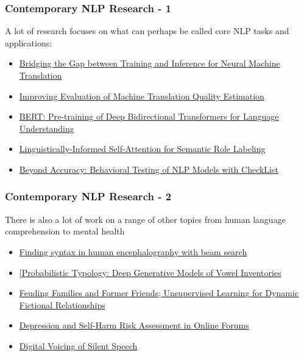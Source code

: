 \documentclass{beamer}
\begin{document}
\begin{frame}
\frametitle{Contemporary NLP Research - 1}
A lot of research focuses on what can perhaps be called core NLP tasks and applications:  
\begin{itemize}
    \item \href{https://www.aclweb.org/anthology/P19-1426/}{Bridging the Gap between Training and Inference for Neural Machine Translation}
    \item \href{https://www.aclweb.org/anthology/P15-1174/}{Improving Evaluation of Machine Translation Quality Estimation}
    \item \href{https://www.aclweb.org/anthology/N19-1423/}{BERT: Pre-training of Deep Bidirectional Transformers for Language Understanding}
    \item \href{https://www.aclweb.org/anthology/D18-1548/}{Linguistically-Informed Self-Attention for Semantic Role Labeling}
    \item \href{https://www.aclweb.org/anthology/2020.acl-main.442}{Beyond Accuracy: Behavioral Testing of NLP Models with CheckList}
\end{itemize}  
\end{frame}

\begin{frame}
\frametitle{Contemporary NLP Research - 2}
There is also a lot of work on a range of other topics from human language comprehension to mental health
\begin{itemize}
\item \href{https://www.aclweb.org/anthology/P18-1254/}{Finding syntax in human encephalography with beam search}
\item \href{https://www.aclweb.org/anthology/P17-1109}{[Probabilistic Typology: Deep Generative Models of Vowel Inventories}
\item \href{https://www.aclweb.org/anthology/N16-1180}{Feuding Families and Former Friends; Unsupervised Learning for Dynamic Fictional Relationships}
\item \href{https://www.aclweb.org/anthology/D17-1322/}{Depression and Self-Harm Risk Assessment in Online Forums}
\item \href{https://www.aclweb.org/anthology/2020.emnlp-main.445/}{Digital Voicing of Silent Speech}
\end{itemize}  
\end{frame}
\end{document}
